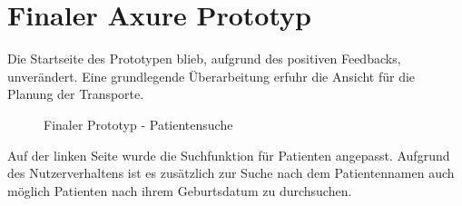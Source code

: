 \documentclass[a4paper, ngerman, 12pt]{scrartcl}
\begin{document}
\section{Finaler Axure Prototyp}
Die Startseite des Prototypen blieb, aufgrund des positiven Feedbacks, unverändert. Eine grundlegende Überarbeitung erfuhr die Ansicht für die Planung der Transporte.
\begin{figure}[h]
\centering
{}
\caption{Finaler Prototyp - Patientensuche}
\label{img:patsearch}
\end{figure}
Auf der linken Seite wurde die Suchfunktion für Patienten angepasst. Aufgrund des Nutzerverhaltens ist es zusätzlich zur Suche nach dem Patientennamen auch möglich Patienten nach ihrem Geburtsdatum zu durchsuchen.
\end{document}
